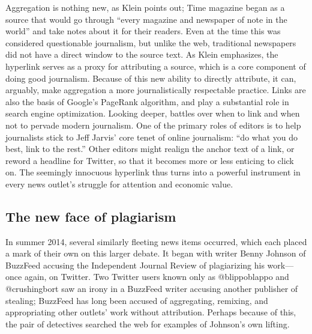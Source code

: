 Aggregation is nothing new, as Klein points out; Time magazine began as a source that would go through ``every magazine and newspaper of note in the world'' and take notes about it for their readers. Even at the time this was considered questionable journalism, but unlike the web, traditional newspapers did not have a direct window to the source text. As Klein emphasizes, the hyperlink serves as a proxy for attributing a source, which is a core component of doing good journalism. Because of this new ability to directly attribute, it can, arguably, make aggregation a more journalistically respectable practice. Links are also the basis of Google's PageRank algorithm, and play a substantial role in search engine optimization. Looking deeper, battles over when to link and when not to pervade modern journalism. One of the primary roles of editors is to help journalists stick to Jeff Jarvis' core tenet of online journalism: ``do what you do best, link to the rest.''\autocite{jarvis_new_2007} Other editors might realign the anchor text of a link, or reword a headline for Twitter, so that it becomes more or less enticing to click on.\autocite{thompson_upworthy:_2013} The seemingly innocuous hyperlink thus turns into a powerful instrument in every news outlet's struggle for attention and economic value.

\subsection{The new face of plagiarism}

In summer 2014, several similarly fleeting news items occurred, which each placed a mark of their own on this larger debate. It began with writer Benny Johnson of BuzzFeed accusing the Independent Journal Review of plagiarizing his work---once again, on Twitter.\autocite{johnson_repeat_2014} Two Twitter users known only as @blippoblappo and @crushingbort saw an irony in a BuzzFeed writer accusing another publisher of stealing; BuzzFeed has long been accused of aggregating, remixing, and appropriating other outlets' work without attribution.\autocite[See, e.g.,][]{manjoo_how_2012, chen_remix_2012} Perhaps because of this, the pair of detectives searched the web for examples of Johnson's own lifting.


